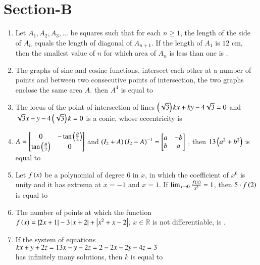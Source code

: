 \documentclass[journal,12pt,onecolumn]{IEEEtran}
\theoremstyle{remark}
\begin{document}
\section{Section-B}
\begin{enumerate}
	\item Let $A_1,A_2,A_3,\dots$ be squares such that for each $n\geq1$, the length of the side of $A_n$ equals the length of diagonal of $A_{n+1}$. If the length of $A_1$ is $12$ cm, then the smallest value of $n$ for which area of $A_n$ is less than one is .\\

	\item The graphs of sine and cosine functions, intersect each other at a number of points and between two consecutive points of intersection, the two graphs enclose the same area $A$. then $A^4$ is equal to \\

	\item The locus of the point of intersection of lines $\left(\sqrt{3}\right)kx+ky-4\sqrt{3}= 0$ and $\sqrt{3}x-y-4\left(\sqrt{3}\right)k=0$ is a conic, whose eccentricity is \\

	\item $A=\begin{bmatrix}
			0 & -\tan{\ensuremath{\left(\frac{\theta}{2}\right)}}\\
			\tan{\ensuremath{\left(\frac{\theta}{2}\right)}} & 0
	\end{bmatrix}$ and $\left(I_2+A\right){\left(I_2-A\right)}^{-1}= \begin{bmatrix}
		a & -b\\
		b & a
	\end{bmatrix}$
		, then $13\left(a^2+b^2\right)$ is equal to \\
		
	\item Let $f\left(x\right)$ be a polynomial of degree $6$ in $x$, in which the coefficient of $x^6$ is unity and it has extrema at $x=-1$ and $x=1$. If $\lim_{x\to 0} \frac{f\left(x\right)}{x^3}=1$, then $5\cdot f\left(2\right)$ is equal to \\

	\item The number of points at which the function $f\left(x\right)=\left\vert2x+1\right\vert-3\left\vert x+2\right\vert+\left\vert x^2+x-2\right\vert$, $x\in\mathbb{R}$ is not differentiable, is .
		
	\item If the system of equations \\
		$kx+y+2z=1\\
		3x-y-2z=2\\
		-2x-2y-4z=3$\\
		has infinitely many solutions, then $k$ is equal to \\


\end{enumerate}
\end{document}
